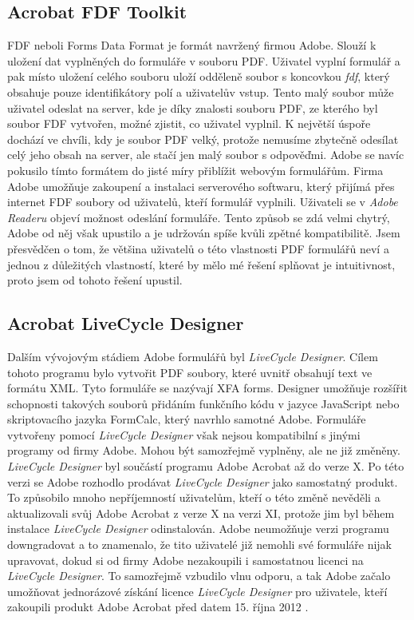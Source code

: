 \documentclass[czech,BP]{thesiskiv}
\begin{document}
\subsection{Acrobat FDF Toolkit}
FDF neboli Forms Data Format je formát navržený firmou Adobe. Slouží k uložení dat vyplněných do formuláře v souboru PDF. Uživatel vyplní formulář a pak místo uložení celého souboru uloží odděleně soubor s koncovkou \emph{fdf}, který obsahuje pouze identifikátory polí a uživatelův vstup. Tento malý soubor může uživatel odeslat na server, kde je díky znalosti souboru PDF, ze kterého byl soubor FDF vytvořen, možné zjistit, co uživatel vyplnil. K největší úspoře dochází ve chvíli, kdy je soubor PDF velký, protože nemusíme zbytečně odesílat celý jeho obsah na server, ale stačí jen malý soubor s odpověďmi. Adobe se navíc pokusilo tímto formátem do jisté míry přiblížit webovým formulářům. Firma Adobe umožňuje zakoupení a instalaci serverového softwaru, který přijímá přes internet FDF soubory od uživatelů, kteří formulář vyplnili. Uživateli se v \emph{Adobe Readeru} objeví možnost odeslání formuláře. Tento způsob se zdá velmi chytrý, Adobe od něj však upustilo a je udržován spíše kvůli zpětné kompatibilitě. Jsem přesvědčen o tom, že většina uživatelů o této vlastnosti PDF formulářů neví a jednou z důležitých vlastností, které by mělo mé řešení splňovat je intuitivnost, proto jsem od tohoto řešení upustil.

\subsection{Acrobat LiveCycle Designer}
Dalším vývojovým stádiem Adobe formulářů byl \emph{LiveCycle Designer}. Cílem tohoto programu bylo vytvořit PDF soubory, které uvnitř obsahují text ve formátu XML. Tyto formuláře se nazývají XFA forms. Designer umožňuje rozšířit schopnosti takových souborů přidáním funkčního kódu v jazyce JavaScript nebo skriptovacího jazyka FormCalc, který navrhlo samotné Adobe. Formuláře vytvořeny pomocí \emph{LiveCycle Designer} však nejsou kompatibilní s jinými programy od firmy Adobe. Mohou být samozřejmě vyplněny, ale ne již změněny. \emph{LiveCycle Designer} byl součástí programu Adobe Acrobat až do verze X. Po této verzi se Adobe rozhodlo prodávat \emph{LiveCycle Designer} jako samostatný produkt. To způsobilo mnoho nepříjemností uživatelům, kteří o této změně nevěděli a aktualizovali svůj Adobe Acrobat z verze X na verzi XI, protože jim byl během instalace \emph{LiveCycle Designer} odinstalován. Adobe neumožňuje verzi programu downgradovat a to znamenalo, že tito uživatelé již nemohli své formuláře nijak upravovat, dokud si od firmy Adobe nezakoupili i samostatnou licenci na \emph{LiveCycle Designer}. To samozřejmě vzbudilo vlnu odporu, a tak Adobe začalo umožňovat jednorázové získání licence \emph{LiveCycle Designer} pro uživatele, kteří zakoupili produkt Adobe Acrobat před datem 15. října 2012 \cite{Adobe_LVD}\cite{Adobe_LVD_forum}.
\end{document}

